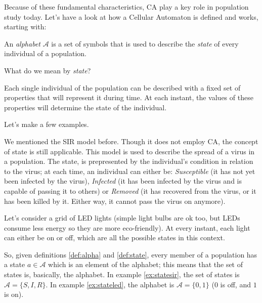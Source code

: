 Because of these fundamental characteristics, CA play a key role in population study today. Let's have
a look at how a Cellular Automaton is defined and works, starting with:

\begin{definition}[Alphabet]
\label{def:alpha}
An \textit{alphabet} $\mathcal{A}$ is a set of symbols that is used to describe
the \textit{state} of every individual of a population.
\end{definition}

What do we mean by \textit{state}? 

\begin{definition}[State]
\label{def:state}
Each single individual of the population can be described with a fixed set of properties that will represent
it during time. At each instant, the values of these properties will determine the state of the individual.
\end{definition}

Let's make a few examples.

\begin{example}
\label{ex:statesir}
We mentioned the SIR model before. Though it does not employ CA, the concept of state is still applicable.
This model is used to describe the spread of a virus in a population.
The state, is prepresented by the individual's condition in relation to the virus; at each time, an individual can either be: \textit{Susceptible} (it has not yet been infected by the virus),
\textit{Infected} (it has been infected by the virus and is capable of passing it to others) or
\textit{Removed} (it has recovered from the virus, or it has been killed by it. Either way,
it cannot pass the virus on anymore).
\end{example}

\begin{example}
\label{ex:stateled}
Let's consider a grid of LED lights (simple light bulbs are ok too, but LEDs
consume less energy so they are more eco-friendly). At every instant, each light can either be on or off,
which are all the possible states in this context.
\end{example}

So, given definitions \ref{def:alpha} and \ref{def:state}, every member of a population has a state
$a \in \mathcal{A}$ which is an element of the alphabet; this means that the set of states
is, basically, the alphabet.
In example \ref{ex:statesir}, the set of states is $\mathcal{A} = \{ S, I, R \}$. In example
\ref{ex:stateled}, the alphabet is $\mathcal{A} = \{ 0, 1 \}$ ($0$ is off, and $1$ is on).

